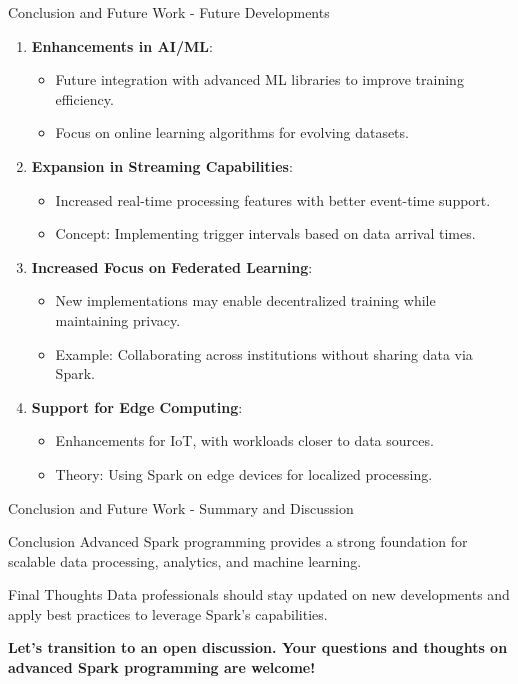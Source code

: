 \documentclass[aspectratio=169]{beamer}
\begin{document}
\begin{frame}[fragile]{Conclusion and Future Work - Future Developments}
    \begin{enumerate}
        \item \textbf{Enhancements in AI/ML}:
        \begin{itemize}
            \item Future integration with advanced ML libraries to improve training efficiency.
            \item Focus on online learning algorithms for evolving datasets.
        \end{itemize}

        \item \textbf{Expansion in Streaming Capabilities}:
        \begin{itemize}
            \item Increased real-time processing features with better event-time support.
            \item Concept: Implementing trigger intervals based on data arrival times.
        \end{itemize}

        \item \textbf{Increased Focus on Federated Learning}:
        \begin{itemize}
            \item New implementations may enable decentralized training while maintaining privacy.
            \item Example: Collaborating across institutions without sharing data via Spark.
        \end{itemize}

        \item \textbf{Support for Edge Computing}:
        \begin{itemize}
            \item Enhancements for IoT, with workloads closer to data sources.
            \item Theory: Using Spark on edge devices for localized processing.
        \end{itemize}
    \end{enumerate}
\end{frame}

\begin{frame}[fragile]{Conclusion and Future Work - Summary and Discussion}
    \begin{block}{Conclusion}
        Advanced Spark programming provides a strong foundation for scalable data processing, analytics, and machine learning. 
    \end{block}
    
    \begin{block}{Final Thoughts}
        Data professionals should stay updated on new developments and apply best practices to leverage Spark's capabilities.
    \end{block}

    \centering
    \textbf{Let’s transition to an open discussion. Your questions and thoughts on advanced Spark programming are welcome!}
\end{frame}
\end{document}
